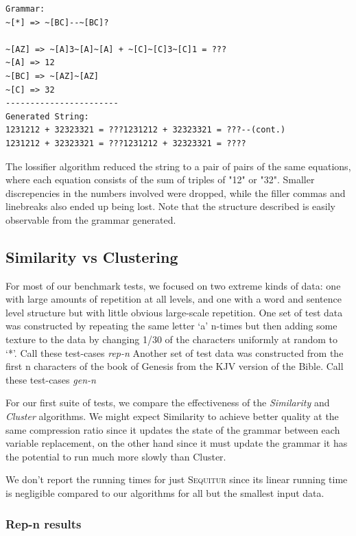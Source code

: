 \documentclass[11pt]{article}
\newcommand{\Sequitur}{\textsc{Sequitur}\xspace}
\begin{document}
\begin{verbatim}
Grammar:
~[*] => ~[BC]--~[BC]?

~[AZ] => ~[A]3~[A]~[A] + ~[C]~[C]3~[C]1 = ???
~[A] => 12
~[BC] => ~[AZ]~[AZ]
~[C] => 32
-----------------------
Generated String:
1231212 + 32323321 = ???1231212 + 32323321 = ???--(cont.)
1231212 + 32323321 = ???1231212 + 32323321 = ????
\end{verbatim}


The lossifier algorithm reduced the string to a pair of
pairs of the same equations, where each equation consists of the
sum of triples of "12" or "32". Smaller discrepencies
in the numbers involved were dropped, while the filler
commas and linebreaks also ended
up being lost. Note that the structure described is easily
observable from the grammar generated.

\subsection{Similarity vs Clustering}
For most of our benchmark tests, we focused on two extreme kinds of data:
one with large amounts of repetition at all levels, and one with a word
and sentence level structure but with little obvious large-scale repetition.
One set of test data was constructed by repeating the same letter `a' n-times
but then adding some
texture to the data by changing 1/30 of the characters uniformly
at random to `*'. Call these test-cases \emph{rep-n}
Another set of test data was constructed from the first n characters of the
book of Genesis from the KJV version of the Bible. 
Call these test-cases \emph{gen-n}

For our first suite of tests, we compare the effectiveness of the
\emph{Similarity} and \emph{Cluster} algorithms. We might expect
Similarity to achieve better quality at the same compression ratio
since it updates the state of the grammar between each variable
replacement, on the other hand since it must update the grammar
it has the potential to run much more slowly than Cluster.

We don't report the running times for just \Sequitur since its linear
running time is negligible compared to our algorithms for all but the
smallest input data.

\subsubsection{Rep-n results}
\end{document}
